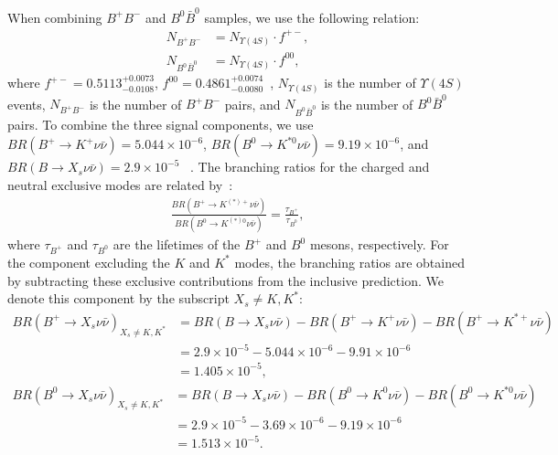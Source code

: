 When combining $B^{+}B^{-}$ and $B^{0}\bar{B}^{0}$ samples, we use the following relation:
\begin{equation}
  \begin{aligned}
      N_{B^{+}B^{-}}&=N_{\Upsilon(4S)}\cdot f^{+-},\\
      N_{B^{0}\bar{B}^{0}}&=N_{\Upsilon(4S)}\cdot f^{00},
  \end{aligned}
\end{equation}
where $f^{+-}=0.5113^{+0.0073}_{-0.0108}$, $f^{00}=0.4861^{+0.0074}_{-0.0080}$~\cite{HeavyFlavorAveragingGroupHFLAV:2024ctg}, $N_{\Upsilon(4S)}$ is the number of $\Upsilon(4S)$ events, $N_{B^{+}B^{-}}$ is the number of $B^{+}B^{-}$ pairs, and $N_{B^{0}\bar{B}^{0}}$ is the number of $B^{0}\bar{B}^{0}$ pairs.
To combine the three signal components, we use $BR(B^{+}\to K^{+}\nu\bar{\nu}) = 5.044\times10^{-6}$, $BR(B^{0}\to K^{*0}\nu\bar{\nu}) = 9.19\times10^{-6}$, and $BR(B\to X_s\nu\bar{\nu}) = 2.9\times10^{-5}$ ~\cite{Buras:2014fpa,Parrott:2022zte}.
The branching ratios for the charged and neutral exclusive modes are related by~\cite{Buras:2014fpa}:
\begin{equation}
  \begin{aligned}
      \frac{BR(B^{+}\rightarrow K^{(*)+}\nu \bar{\nu})}{BR(B^{0}\rightarrow K^{(*)0}\nu \bar{\nu})} = \frac{\tau_{B^{+}}}{\tau_{B^{0}}},
  \end{aligned}
\end{equation}
where $\tau_{B^{+}}$ and $\tau_{B^{0}}$ are the lifetimes of the $B^{+}$ and $B^{0}$ mesons, respectively.
For the component excluding the $K$ and $K^{*}$ modes, the branching ratios are obtained by subtracting these exclusive contributions from the inclusive prediction.
We denote this component by the subscript $X_{s}\neq K,K^{*}$:
\begin{equation}
\begin{aligned}
  BR(B^{+}\rightarrow X_s \nu \bar{\nu})_{X_{s}\neq K,K^{*}} &= BR(B\rightarrow X_{s}\nu \bar{\nu}) - BR(B^{+}\rightarrow K^{+}\nu \bar{\nu}) - BR(B^{+}\rightarrow K^{*+}\nu \bar{\nu})\\
  &= 2.9 \times 10^{-5} - 5.044 \times 10^{-6} - 9.91 \times 10^{-6}\\
  &= 1.405 \times 10^{-5},
\end{aligned}
\end{equation}
\begin{equation}
\begin{aligned}
  BR(B^{0}\rightarrow X_s \nu \bar{\nu})_{X_{s}\neq K,K^{*}} &= BR(B\rightarrow X_{s}\nu \bar{\nu}) - BR(B^{0}\rightarrow K^{0}\nu \bar{\nu}) - BR(B^{0}\rightarrow K^{*0}\nu \bar{\nu})\\
  &= 2.9 \times 10^{-5} - 3.69 \times 10^{-6} - 9.19 \times 10^{-6}\\
  &= 1.513 \times 10^{-5}.
\end{aligned}
\end{equation}

